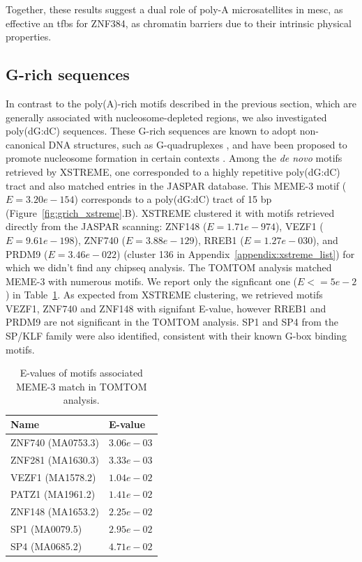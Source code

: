 \documentclass[11pt]{book}
\begin{document}
Together, these results suggest a dual role of poly-A microsatellites in \gls{mesc}, as effective an \gls{tfbs} for ZNF384, as chromatin barriers due to their intrinsic physical properties.

\FloatBarrier
\subsection{G-rich sequences}
In contrast to the poly(A)-rich motifs described in the previous section, which are generally associated with nucleosome-depleted regions, we also investigated poly(dG:dC) sequences. These G-rich sequences are known to adopt non-canonical DNA structures, such as G-quadruplexes \cite{spiegel_structure_2020}, and have been proposed to promote nucleosome formation in certain contexts \cite{collings_effects_2013, masoudi-sobhanzadeh_interpretable_2024, mondo_consecutive_2025}. Among the \textit{de novo} motifs retrieved by XSTREME, one corresponded to a highly repetitive poly(dG:dC) tract and also matched entries in the JASPAR database. This MEME-3 motif ($E=3.20e-154$) corresponds to a poly(dG:dC) tract of 15 bp (Figure~\ref{fig:grich_xstreme}.B). XSTREME clustered it with motifs retrieved directly from the JASPAR scanning: ZNF148 ($E=1.71e-974$), VEZF1 ($E=9.61e-198$), ZNF740 ($E=3.88e-129$), RREB1 ($E=1.27e-030$), and PRDM9 ($E=3.46e-022$) (cluster 136 in Appendix~\ref{appendix:xstreme_list}) for which we didn't find any \gls{chipseq} analysis. The TOMTOM analysis matched MEME-3 with numerous motifs. We report only the signficant one ($E<=5e-2$) in Table~\ref{table:polyG}. As expected from XSTREME clustering, we retrieved motifs VEZF1, ZNF740 and ZNF148 with signifant E-value, however RREB1 and PRDM9 are not significant in the TOMTOM analysis. SP1 and SP4 from the SP/KLF family were also identified, consistent with their known G-box binding motifs.

\begin{table}[htbp]
    \centering
    \begin{tabular}{ll}
    \hline
    \textbf{Name} & \textbf{E-value} \\
    \hline
        ZNF740 (MA0753.3) & $3.06e-03$ \\
        ZNF281 (MA1630.3) & $3.33e-03$ \\
        VEZF1 (MA1578.2) & $1.04e-02$ \\
        PATZ1 (MA1961.2) & $1.41e-02$ \\
        ZNF148 (MA1653.2) & $2.25e-02$ \\
        SP1 (MA0079.5) & $2.95e-02$ \\
        SP4 (MA0685.2) & $4.71e-02$ \\
    \hline
    \end{tabular}
    \caption{E-values of motifs associated MEME-3 match in TOMTOM analysis.}
    \label{table:polyG}
\end{table}
\end{document}
